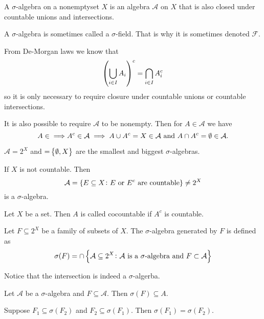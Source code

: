\documentclass[11pt,a4paper]{article}
\newcommand{\A}{\mathcal A}
\begin{document}
\begin{definition}
  A $\sigma$-algebra on a nonemptyset $X$ is an algebra $\mathcal A$ on
  $X$ that is also closed under countable unions and intersections.
\end{definition}

\begin{remark}
  A $\sigma$-algebra is sometimes called a $\sigma$-field.
  That is why it is sometimes denoted $\mathcal F$.
\end{remark}

\begin{remark}
  From De-Morgan laws we know that
  \[
    \del{\bigcup_{i \in I} A_i}^c =
    \bigcap_{i \in I} A_i^c
  \]
  so it is only necessary to require closure under countable unions
  or countable intersections.
\end{remark}

\begin{remark}
  It is also possible to require $\mathcal A$ to be nonempty.
  Then for $A \in \mathcal A$ we have
  \[
    A \in \mathcal \implies A^c \in \mathcal A \implies
    A \cup A^c = X \in \mathcal A \text{ and }
    A \cap A^c = \emptyset \in \mathcal A.
  \]
\end{remark}

\begin{example}
  $\mathcal A = 2^X$ and $\mathcal = \set{\emptyset, X}$ are the smallest
  and biggest $\sigma$-algebras.
\end{example}

\begin{example}
  If $X$ is not countable.
  Then
  \[
    \mathcal A =
    \set{E \subseteq X \colon E \text{ or }E^c \text{ are countable}} \neq
    2^X
  \]
  is a $\sigma$-algebra.
\end{example}

\begin{definition}[Cocountablility]
  Let $X$ be a set. Then $A$ is called cocountable if $A^c$ is countable.
\end{definition}

\begin{example}
  Let $F \subseteq 2^X$ be a family of subsets of $X$.
  The $\sigma$-algebra generated by $F$ is defined as
  \[
    \sigma(F) = \cap \set{\mathcal A \subseteq 2^X \colon 
  \mathcal A \text{ is a $\sigma$-algebra} \text{ and }F \subset \mathcal A}
  \]
\end{example}
\begin{remark}
  Notice that the intersection is indeed a $\sigma$-algerba.
\end{remark}
\begin{remark}
  Let $\A$ be a $\sigma$-algebra and $F \subseteq \A$.
  Then $\sigma(F) \subseteq A$.
\end{remark}
\begin{corollary}
  Suppose $F_1 \subseteq \sigma(F_2)$ and $F_2 \subseteq \sigma(F_1)$.
  Then $\sigma(F_1) = \sigma(F_2)$.
\end{corollary}
\end{document}
